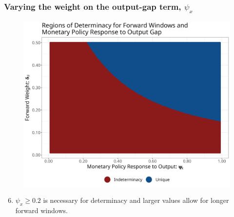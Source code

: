 \documentclass{beamer}
\begin{document}
\begin{frame}
	\frametitle{Varying the weight on the output-gap term, $\psi_x$}	
	\begin{center}		
		\begin{figure}%
			\includegraphics[width=\textwidth,height=0.6\textheight,keepaspectratio]{../code/psix_deltaF.png}
		\end{figure}%
	\end{center}%
	\begin{enumerate}
		\setcounter{enumi}{5}
		\setlength{\itemsep}{1em}
		\item $\psi_x \geq 0.2$ is necessary for determinacy and larger values allow for longer forward windows.  
	\end{enumerate}
\end{frame}
\end{document}
